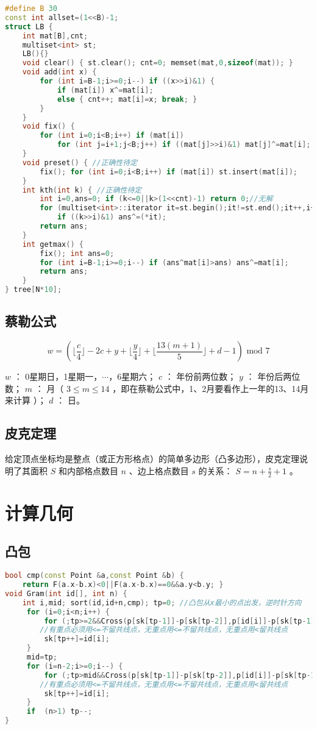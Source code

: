 \documentclass[landscape,a4paper]{article}
\begin{document}
\begin{lstlisting}[language=C++]
#define B 30
const int allset=(1<<B)-1;
struct LB {
	int mat[B],cnt;
	multiset<int> st;
	LB(){}
	void clear() { st.clear(); cnt=0; memset(mat,0,sizeof(mat)); }
	void add(int x) {
		for (int i=B-1;i>=0;i--) if ((x>>i)&1) {
		    if (mat[i]) x^=mat[i]; 
		    else { cnt++; mat[i]=x; break; }
		}
	}
	void fix() {
		for (int i=0;i<B;i++) if (mat[i])
		    for (int j=i+1;j<B;j++) if ((mat[j]>>i)&1) mat[j]^=mat[i];
	}
	void preset() { //正确性待定
		fix(); for (int i=0;i<B;i++) if (mat[i]) st.insert(mat[i]);
	}
	int kth(int k) { //正确性待定
		int i=0,ans=0; if (k<=0||k>(1<<cnt)-1) return 0;//无解
		for (multiset<int>::iterator it=st.begin();it!=st.end();it++,i++)
			if ((k>>i)&1) ans^=(*it);
		return ans;
	}
	int getmax() {
		fix(); int ans=0;
		for (int i=B-1;i>=0;i--) if (ans^mat[i]>ans) ans^=mat[i];
		return ans;
	}
} tree[N*10];
\end{lstlisting}


\subsection{蔡勒公式}

$$w = (\lfloor \frac{c}{4} \rfloor - 2c + y + \lfloor \frac{y}{4} \rfloor + \lfloor \frac{13(m+1)}{5} \rfloor + d - 1) \text{ mod } 7$$

 $w$ ： 0星期日，1星期一，$\cdots$，6星期六；
 $c$ ： 年份前两位数；
 $y$ ： 年份后两位数；
 $m$ ： 月（ $3 \leq m \leq 14$ ，即在蔡勒公式中，1、2月要看作上一年的13、14月来计算 ）；
 $d$ ： 日。

\subsection{皮克定理}

给定顶点坐标均是整点（或正方形格点）的简单多边形（凸多边形），皮克定理说明了其面积 $S$ 和内部格点数目 $n$ 、边上格点数目 $s$ 的关系： $S = n + \frac{s}{2} + 1$ 。


\section{计算几何}

\subsection{凸包}
\begin{lstlisting}[language=C++]
bool cmp(const Point &a,const Point &b) {
	return F(a.x-b.x)<0||F(a.x-b.x)==0&&a.y<b.y; }
void Gram(int id[], int n) {
	int i,mid; sort(id,id+n,cmp); tp=0; //凸包从x最小的点出发，逆时针方向
     for (i=0;i<n;i++) {
         for (;tp>=2&&Cross(p[sk[tp-1]]-p[sk[tp-2]],p[id[i]]-p[sk[tp-1]])<=0;tp--); 
		//有重点必须用<=不留共线点，无重点用<=不留共线点，无重点用<留共线点
         sk[tp++]=id[i];
     }
     mid=tp;
     for (i=n-2;i>=0;i--) {
         for (;tp>mid&&Cross(p[sk[tp-1]]-p[sk[tp-2]],p[id[i]]-p[sk[tp-1]])<=0;tp--); 
		//有重点必须用<=不留共线点，无重点用<=不留共线点，无重点用<留共线点
         sk[tp++]=id[i];
     }
     if  (n>1) tp--;
}
\end{lstlisting}
\end{document}
